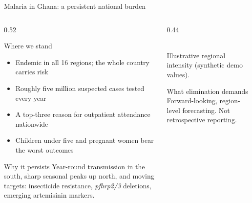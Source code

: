 \documentclass[aspectratio=169,11pt]{beamer}
\begin{document}
\begin{frame}{Malaria in Ghana: a persistent national burden}
  \begin{columns}[c]
    \begin{column}{0.52\textwidth}
      \begin{block}{Where we stand}
        \begin{itemize}
          \item Endemic in all 16 regions; the whole country carries risk
          \item Roughly five million suspected cases tested every year
          \item A top-three reason for outpatient attendance nationwide
          \item Children under five and pregnant women bear the worst outcomes
        \end{itemize}
      \end{block}
      \begin{alertblock}{Why it persists}
        Year-round transmission in the south, sharp seasonal peaks up north, and
        moving targets: insecticide resistance, \emph{pfhrp2/3} deletions,
        emerging artemisinin markers.
      \end{alertblock}
    \end{column}
    \begin{column}{0.44\textwidth}
      \centering
      \\
      {\scriptsize\textcolor{slate}{Illustrative regional intensity (synthetic demo values).}}
      \vspace{2mm}
      \begin{block}{What elimination demands}
        Forward-looking, region-level forecasting. Not retrospective reporting.
      \end{block}
    \end{column}
  \end{columns}
\end{frame}
\end{document}
